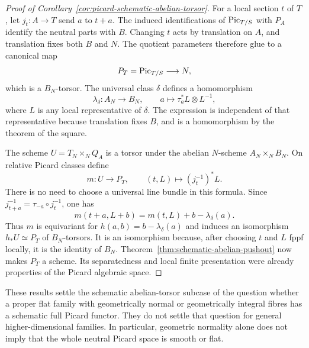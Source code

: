 \begin{proof}[Proof of Corollary~\ref{cor:picard-schematic-abelian-torsor}]
For a local section $t$ of $T$, let
$j_t:A\to T$ send $a$ to $t+a$.
The induced identifications of $\operatorname{Pic}_{T/S}$ with $P_A$ identify
the neutral parts with $B$. Changing $t$ acts by translation on
$A$, and translation fixes both $B$ and $N$. The quotient parameters
therefore glue to a canonical map
\[
 P_T=\operatorname{Pic}_{T/S}\longrightarrow N,
\]
which is a $B_N$-torsor. The universal class $\delta$ defines
a homomorphism
\[
 \lambda_\delta:A_N\longrightarrow B_N,\qquad
 a\longmapsto \tau_a^*L\otimes L^{-1},
\]
where $L$ is any local representative of $\delta$.
The expression is independent of that representative because
translation fixes $B$, and is a homomorphism by the theorem of
the square.

The scheme $U=T_N\times_N Q_A$ is a torsor under the abelian
$N$-scheme $A_N\times_N B_N$. On relative Picard classes define
\[
 m:U\longrightarrow P_T,\qquad
 (t,L)\longmapsto(j_t^{-1})^*L.
\]
There is no need to choose a universal line bundle in this formula.
Since $j_{t+a}^{-1}=\tau_{-a}\circ j_t^{-1}$, one has
\[
 m(t+a,L+b)=m(t,L)+b-\lambda_\delta(a).
\]
Thus $m$ is equivariant for
$h(a,b)=b-\lambda_\delta(a)$ and induces an isomorphism
$h_*U\simeq P_T$ of $B_N$-torsors. It is an isomorphism because,
after choosing $t$ and $L$ fppf locally, it is the identity of $B_N$.
Theorem~\ref{thm:schematic-abelian-pushout} now makes $P_T$ a
scheme. Its separatedness and local finite presentation were
already properties of the Picard algebraic space.
\end{proof}

\begin{remark}
These results settle the schematic abelian-torsor subcase of the
question whether a proper flat family with geometrically normal
or geometrically integral fibres has a schematic full Picard functor.
They do not settle that question for general higher-dimensional
families. In particular, geometric normality alone does not imply
that the whole neutral Picard space is smooth or flat.
\end{remark}
